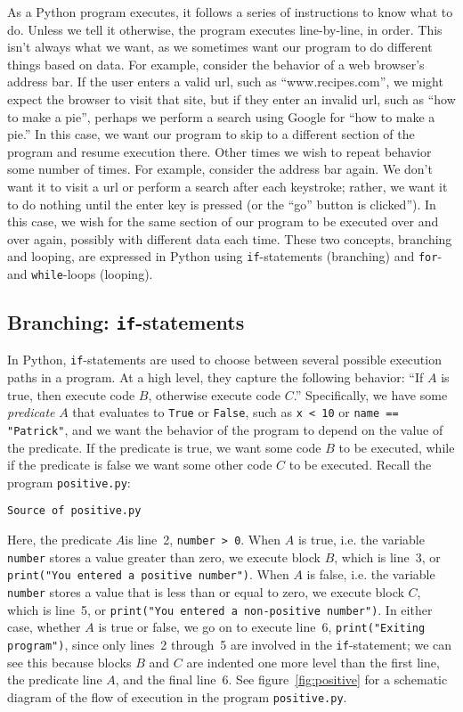 \documentclass{article}
\newcommand{\example}[1]{%
  \par
  \vspace{.5em}
  \noindent \texttt{Source of #1}
  
  \vspace{.5em}
}
\begin{document}
As a Python program executes, it follows a series of instructions to
know what to do. Unless we tell it otherwise, the program executes
line-by-line, in order. This isn't always what we want, as we
sometimes want our program to do different things based on data. For
example, consider the behavior of a web browser's address bar. If the
user enters a valid url, such as ``www.recipes.com'', we might expect
the browser to visit that site, but if they enter an invalid url, such
as ``how to make a pie'', perhaps we perform a search using Google for
``how to make a pie.'' In this case, we want our program to skip to a
different section of the program and resume execution there. Other
times we wish to repeat behavior some number of times. For example,
consider the address bar again. We don't want it to visit a url or
perform a search after each keystroke; rather, we want it to do
nothing until the enter key is pressed (or the ``go'' button is
clicked''). In this case, we wish for the same section of our program
to be executed over and over again, possibly with different data each
time. These two concepts, branching and looping, are expressed in
Python using \texttt{if}-statements (branching) and \texttt{for}- and
\texttt{while}-loops (looping).

\subsection{Branching: \texttt{if}-statements}

In Python, \texttt{if}-statements are used to choose between several
possible execution paths in a program. At a high level, they capture
the following behavior: ``If $A$ is true, then execute code $B$,
otherwise execute code $C$.'' Specifically, we have some
\textit{predicate} $A$ that evaluates to \texttt{True} or
\texttt{False}, such as \texttt{x < 10} or \texttt{name == "Patrick"},
and we want the behavior of the program to depend on the value of the
predicate. If the predicate is true, we want some code $B$ to be
executed, while if the predicate is false we want some other code $C$
to be executed. Recall the program \texttt{positive.py}:
\example{positive.py}
Here, the predicate $A$is line~2, \texttt{number > 0}. When $A$ is
true, i.e. the variable \texttt{number} stores a value greater than
zero, we execute block $B$, which is line~3, or \texttt{print("You
  entered a positive number")}. When $A$ is false, i.e. the variable
\texttt{number} stores a value that is less than or equal to zero, we
execute block $C$, which is line~5, or \texttt{print("You entered a
  non-positive number")}. In either case, whether $A$ is true or
false, we go on to execute line~6, \texttt{print("Exiting program")},
since only lines~2 through~5 are involved in the
\texttt{if}-statement; we can see this because blocks $B$ and $C$ are
indented one more level than the first line, the predicate line $A$,
and the final line~6. See figure~\ref{fig:positive} for a schematic
diagram of the flow of execution in the program \texttt{positive.py}.
\end{document}
